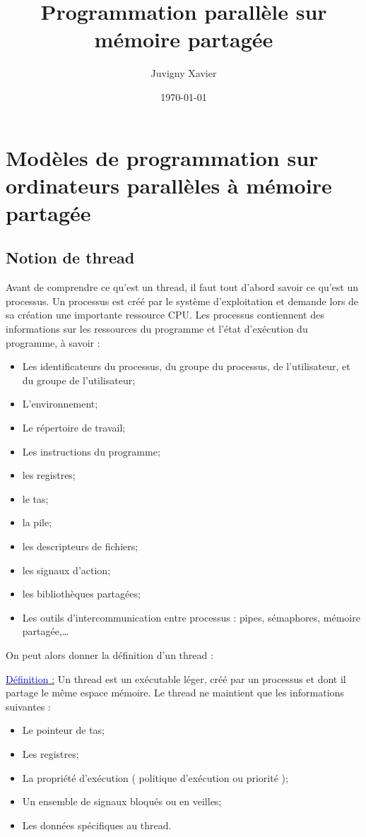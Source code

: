 \documentclass[fleqn,11pt]{article}
\title{Programmation parallèle sur mémoire partagée}
\author{Juvigny Xavier}
\date{\today}
\begin{document}
\maketitle
\tableofcontents

\section{Modèles de programmation sur ordinateurs parallèles à mémoire partagée}

\subsection{Notion de thread}

Avant de comprendre ce qu'est un thread, il faut tout d'abord savoir ce qu'est un processus.
Un processus est créé par le système d'exploitation et demande lors de sa création une
importante ressource CPU. Les processus contiennent des informations sur les ressources
du programme et l'état d'exécution du programme, à savoir :
\begin{itemize}
 \item Les identificateurs du processus, du groupe du processus, de l'utilisateur, et du groupe de l'utilisateur;
 \item L'environnement;
 \item Le répertoire de travail;
 \item Les instructions du programme;
 \item les registres;
 \item le tas;
 \item la pile;
 \item les descripteurs de fichiers;
 \item les signaux d'action;
 \item les bibliothèques partagées;
 \item Les outils d'intercommunication entre processus : pipes, sémaphores, mémoire partagée,\ldots
\end{itemize}

On peut alors donner la définition d'un thread : 

\underline{\textcolor{blue}{Définition} :} Un thread est un exécutable léger,
créé par un processus et dont il partage le même espace mémoire. Le thread ne maintient
que les informations suivantes :
\begin{itemize}
 \item Le pointeur de tas;
 \item Les registres;
 \item La propriété d'exécution ( politique d'exécution ou priorité );
 \item Un ensemble de signaux bloqués ou en veilles;
 \item Les données spécifiques au thread.
\end{itemize}
\end{document}

